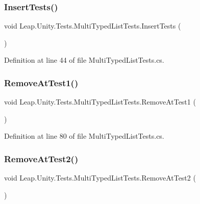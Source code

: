 \subsubsection{\texorpdfstring{InsertTests()}{InsertTests()}}
{\footnotesize\ttfamily void Leap.\+Unity.\+Tests.\+Multi\+Typed\+List\+Tests.\+Insert\+Tests (\begin{DoxyParamCaption}{ }\end{DoxyParamCaption})}



Definition at line 44 of file Multi\+Typed\+List\+Tests.\+cs.

\mbox{\label{class_leap_1_1_unity_1_1_tests_1_1_multi_typed_list_tests_a127d0c279c27fac41ad8e95811f0ba84}} 
\subsubsection{\texorpdfstring{RemoveAtTest1()}{RemoveAtTest1()}}
{\footnotesize\ttfamily void Leap.\+Unity.\+Tests.\+Multi\+Typed\+List\+Tests.\+Remove\+At\+Test1 (\begin{DoxyParamCaption}{ }\end{DoxyParamCaption})}



Definition at line 80 of file Multi\+Typed\+List\+Tests.\+cs.

\mbox{\label{class_leap_1_1_unity_1_1_tests_1_1_multi_typed_list_tests_a6c2b2ebcdc9e5b0adf49e28f3896d1fb}} 
\subsubsection{\texorpdfstring{RemoveAtTest2()}{RemoveAtTest2()}}
{\footnotesize\ttfamily void Leap.\+Unity.\+Tests.\+Multi\+Typed\+List\+Tests.\+Remove\+At\+Test2 (\begin{DoxyParamCaption}{ }\end{DoxyParamCaption})}



